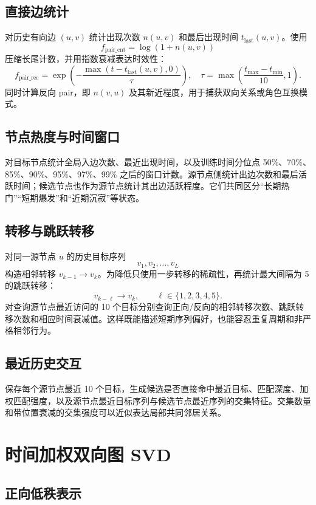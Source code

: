 \documentclass[UTF8,a4paper,11pt]{ctexart}
\begin{document}
\subsection{直接边统计}

对历史有向边 $(u,v)$ 统计出现次数 $n(u,v)$ 和最后出现时间 $t_{\mathrm{last}}(u,v)$。使用
\[
f_{\mathrm{pair\_cnt}}=\log(1+n(u,v))
\]
压缩长尾计数，并用指数衰减表达时效性：
\[
f_{\mathrm{pair\_rec}}
=\exp\left(-\frac{\max(t-t_{\mathrm{last}}(u,v),0)}{\tau}\right),
\quad
\tau=\max\left(\frac{t_{\max}-t_{\min}}{10},1\right).
\]
同时计算反向 pair，即 $n(v,u)$ 及其新近程度，用于捕获双向关系或角色互换模式。

\subsection{节点热度与时间窗口}

对目标节点统计全局入边次数、最近出现时间，以及训练时间分位点 50\%、70\%、85\%、90\%、95\%、97\%、99\% 之后的窗口计数。源节点侧统计出边次数和最后活跃时间；候选节点也作为源节点统计其出边活跃程度。它们共同区分“长期热门”“短期爆发”和“近期沉寂”等状态。

\subsection{转移与跳跃转移}

对同一源节点 $u$ 的历史目标序列
\[
v_1,v_2,\ldots,v_L
\]
构造相邻转移 $v_{k-1}\rightarrow v_k$。为降低只使用一步转移的稀疏性，再统计最大间隔为 5 的跳跃转移：
\[
v_{k-\ell}\rightarrow v_k,\qquad \ell\in\{1,2,3,4,5\}.
\]
对查询源节点最近访问的 10 个目标分别查询正向/反向的相邻转移次数、跳跃转移次数和相应时间衰减值。这样既能描述短期序列偏好，也能容忍重复周期和非严格相邻行为。

\subsection{最近历史交互}

保存每个源节点最近 10 个目标，生成候选是否直接命中最近目标、匹配深度、加权匹配强度，以及源节点最近目标序列与候选节点最近序列的交集特征。交集数量和带位置衰减的交集强度可以近似表达局部共同邻居关系。

\section{时间加权双向图 SVD}

\subsection{正向低秩表示}
\end{document}
